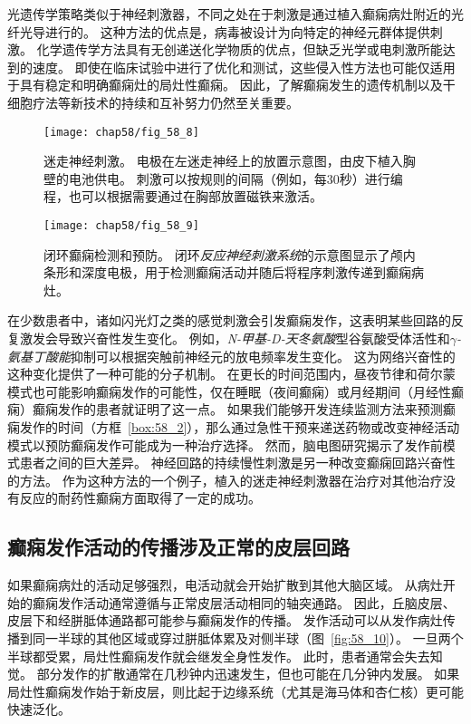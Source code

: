 \begin{proposition}[实时检测和预防癫痫的新方法]
	\quad \quad 光遗传学策略类似于神经刺激器，不同之处在于刺激是通过植入癫痫病灶附近的光纤光导进行的。
	这种方法的优点是，病毒被设计为向特定的神经元群体提供刺激。
	化学遗传学方法具有无创递送化学物质的优点，但缺乏光学或电刺激所能达到的速度。
	即使在临床试验中进行了优化和测试，这些侵入性方法也可能仅适用于具有稳定和明确癫痫灶的局灶性癫痫。
	因此，了解癫痫发生的遗传机制以及干细胞疗法等新技术的持续和互补努力仍然至关重要。
	
\end{proposition}


\begin{figure}[htbp]
	\centering
	\texttt{[image: chap58/fig\_58\_8]}
	\caption{迷走神经刺激。
		电极在左迷走神经上的放置示意图，由皮下植入胸壁的电池供电。
		刺激可以按规则的间隔（例如，每30秒）进行编程，也可以根据需要通过在胸部放置磁铁来激活\cite{stacey2008technology}。}
	\label{fig:58_8}
\end{figure}


\begin{figure}[htbp]
	\centering
	\texttt{[image: chap58/fig\_58\_9]}
	\caption{闭环癫痫检测和预防。
		闭环\textit{反应神经刺激系统}的示意图显示了颅内条形和深度电极，用于检测癫痫活动并随后将程序刺激传递到癫痫病灶\cite{heck2014two}。}
	\label{fig:58_9}
\end{figure}



在少数患者中，诸如闪光灯之类的感觉刺激会引发癫痫发作，这表明某些回路的反复激发会导致兴奋性发生变化。
例如，\textit{N-甲基-D-天冬氨酸}型谷氨酸受体活性和\textit{$\gamma$-氨基丁酸能}抑制可以根据突触前神经元的放电频率发生变化。
这为网络兴奋性的这种变化提供了一种可能的分子机制。
在更长的时间范围内，昼夜节律和荷尔蒙模式也可能影响癫痫发作的可能性，仅在睡眠（夜间癫痫）或月经期间（月经性癫痫）癫痫发作的患者就证明了这一点。
如果我们能够开发连续监测方法来预测癫痫发作的时间（方框~\ref{box:58_2}），那么通过急性干预来递送药物或改变神经活动模式以预防癫痫发作可能成为一种治疗选择。
然而，脑电图研究揭示了发作前模式患者之间的巨大差异。
神经回路的持续慢性刺激是另一种改变癫痫回路兴奋性的方法。
作为这种方法的一个例子，植入的迷走神经刺激器在治疗对其他治疗没有反应的耐药性癫痫方面取得了一定的成功。



\subsection{癫痫发作活动的传播涉及正常的皮层回路}

如果癫痫病灶的活动足够强烈，电活动就会开始扩散到其他大脑区域。
从病灶开始的癫痫发作活动通常遵循与正常皮层活动相同的轴突通路。
因此，丘脑皮层、皮层下和经胼胝体通路都可能参与癫痫发作的传播。
发作活动可以从发作病灶传播到同一半球的其他区域或穿过胼胝体累及对侧半球（图~\ref{fig:58_10}）。
一旦两个半球都受累，局灶性癫痫发作就会继发全身性发作。
此时，患者通常会失去知觉。
部分发作的扩散通常在几秒钟内迅速发生，但也可能在几分钟内发展。
如果局灶性癫痫发作始于新皮层，则比起于边缘系统（尤其是海马体和杏仁核）更可能快速泛化。


